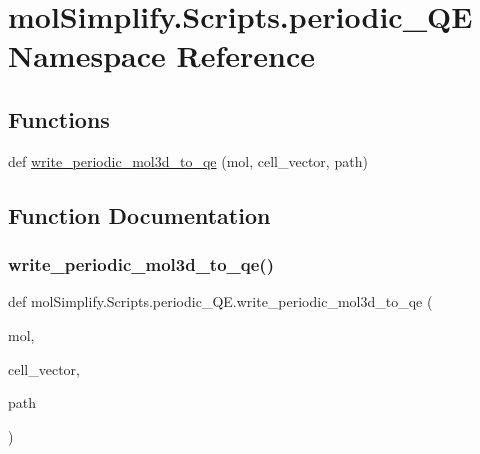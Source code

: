 \hypertarget{namespacemolSimplify_1_1Scripts_1_1periodic__QE}{}\section{mol\+Simplify.\+Scripts.\+periodic\+\_\+\+QE Namespace Reference}
\label{namespacemolSimplify_1_1Scripts_1_1periodic__QE}
\subsection*{Functions}
\begin{DoxyCompactItemize}
\item 
def \hyperlink{namespacemolSimplify_1_1Scripts_1_1periodic__QE_a9a06bacee3a3e5b18637275f03510ade}{write\+\_\+periodic\+\_\+mol3d\+\_\+to\+\_\+qe} (mol, cell\+\_\+vector, path)
\end{DoxyCompactItemize}


\subsection{Function Documentation}
\mbox{\label{namespacemolSimplify_1_1Scripts_1_1periodic__QE_a9a06bacee3a3e5b18637275f03510ade}} 
\subsubsection{\texorpdfstring{write\+\_\+periodic\+\_\+mol3d\+\_\+to\+\_\+qe()}{write\_periodic\_mol3d\_to\_qe()}}
{\footnotesize\ttfamily def mol\+Simplify.\+Scripts.\+periodic\+\_\+\+Q\+E.\+write\+\_\+periodic\+\_\+mol3d\+\_\+to\+\_\+qe (\begin{DoxyParamCaption}\item[{}]{mol,  }\item[{}]{cell\+\_\+vector,  }\item[{}]{path }\end{DoxyParamCaption})}

